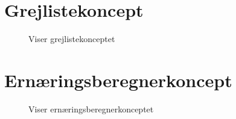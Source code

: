 \documentclass[12pt, a4paper]{article}
\begin{document}
\section{Grejlistekoncept}
\begin{figure}[H]
    \centering
    \caption{Viser grejlistekonceptet}
\end{figure}

\section{Ernæringsberegnerkoncept}
\begin{figure}[H]
    \centering
    \caption{Viser ernæringsberegnerkonceptet}
\end{figure}
\end{document}
